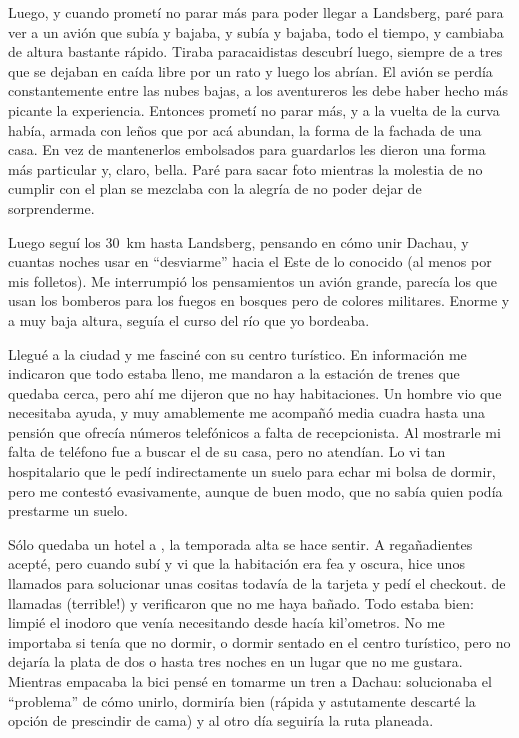 Luego, y cuando promet\'i no parar m\'as para poder llegar a Landsberg, par\'e
para ver a un avi\'on que sub\'ia y bajaba, y sub\'ia y bajaba, todo el
tiempo, y cambiaba de altura bastante r\'apido. Tiraba paracaidistas
descubr\'i luego, siempre de a tres que se dejaban en ca\'ida libre por un
rato y luego los abr\'ian. El avi\'on se perd\'ia constantemente entre las nubes
bajas, a los aventureros les debe haber hecho m\'as picante la experiencia.
Entonces promet\'i no parar m\'as, y a la vuelta de la curva hab\'ia, armada con
le\~nos que por ac\'a abundan, la forma de la fachada de una casa. En vez de
mantenerlos embolsados para guardarlos les dieron una forma m\'as particular y,
claro, bella. Par\'e para sacar foto mientras la molestia de no cumplir con el
plan se mezclaba con la alegr\'ia de no poder dejar de sorprenderme.

Luego segu\'i los 30~km hasta Landsberg, pensando en c\'omo unir Dachau, y
cuantas noches usar en ``desviarme'' hacia el Este de lo conocido (al menos por
mis folletos). Me interrumpi\'o los pensamientos un avi\'on grande, parec\'ia
los que usan los bomberos para los fuegos en bosques pero de colores militares.
Enorme y a muy baja altura, segu\'ia el curso del r\'io que yo bordeaba.

Llegu\'e a la ciudad y me fascin\'e con su centro tur\'istico. En
informaci\'on me indicaron que todo estaba lleno, me mandaron a la estaci\'on
de trenes que quedaba cerca, pero ah\'i me dijeron que no hay habitaciones. Un
hombre vio que necesitaba ayuda, y muy amablemente me acompa\~n\'o media
cuadra hasta una pensi\'on que ofrec\'ia n\'umeros telef\'onicos a falta de
recepcionista. Al mostrarle mi falta de tel\'efono fue a buscar el de su casa,
pero no atend\'ian. Lo vi tan hospitalario que le ped\'i indirectamente un
suelo para echar mi bolsa de dormir, pero me contest\'o evasivamente, aunque
de buen modo, que no sab\'ia quien pod\'ia prestarme un suelo.

S\'olo quedaba un hotel a , la temporada alta se hace
sentir. A rega\~nadientes acept\'e, pero cuando sub\'i y vi que la
habitaci\'on era fea y oscura, hice unos llamados para solucionar unas cositas
todav\'ia de la tarjeta y ped\'i el checkout.  de llamadas
(\textexclamdown terrible!) y verificaron que no me haya ba\~nado. Todo estaba
bien: limpi\'e el inodoro que ven\'ia necesitando desde hac\'ia kil'ometros. No
me importaba si ten\'ia que no dormir, o dormir sentado en el centro
tur\'istico, pero no dejar\'ia la plata de dos o hasta tres noches en un lugar
que no me gustara. Mientras empacaba la bici pens\'e en tomarme un tren a
Dachau: solucionaba el ``problema'' de c\'omo unirlo, dormir\'ia bien
(r\'apida y astutamente descart\'e la opci\'on de prescindir de cama) y al
otro d\'ia seguir\'ia la ruta planeada.

